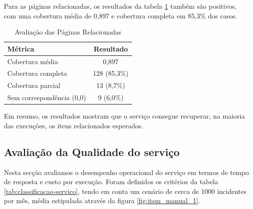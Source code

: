 		
		Para as páginas relacionadas, os resultados da tabela \ref{tab:avaliacao-paginas-relacionadas} também são positivos, com uma cobertura média de 0,897 e cobertura completa em 85,3\% dos casos.
		
		\begin{table}[H]
			\centering
			\small
			\begin{tabular}{lc}
				\hline
				\textbf{Métrica} & \textbf{Resultado} \\
				\hline
				Cobertura média & 0,897 \\
				\hline
				Cobertura completa & 128 (85,3\%) \\
				\hline
				Cobertura parcial & 13 (8,7\%) \\
				\hline
				Sem correspondência (0,0) & 9 (6,0\%) \\
				\hline
			\end{tabular}
			\caption[Avaliação das Páginas Relacionadas]{Avaliação das Páginas Relacionadas}
			\label{tab:avaliacao-paginas-relacionadas}
		\end{table}
		
		Em resumo, os resultados mostram que o serviço consegue recuperar, na maioria das execuções, os itens relacionados esperados.
	
	\subsection{Avaliação da Qualidade do serviço}
	
		
		
					
		
		Nesta secção avaliamos o desempenho operacional do serviço em termos de tempo de resposta e custo por execução. 
		Foram definidos os critérios da tabela \ref{tab:classificacao-servico}, tendo em conta um cenário de cerca de 1000 incidentes por mês, média estipulada através da figura \ref{fig:itsm_manual_1}.
		
